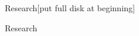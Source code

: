 \documentclass[table]{beamer}
\begin{document}
\begin{frame}{Research}{[put full disk at beginning]}
\end{frame}%
\begin{frame}{Research}
    \hspace{-0.08\paperwidth}
\end{frame}%
\end{document}

